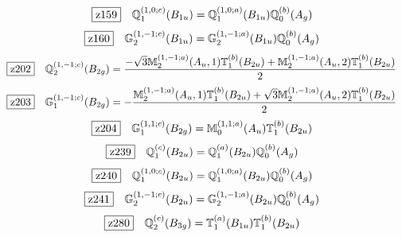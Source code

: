 \documentclass[fleqn,10pt,landscape]{jsarticle}
\begin{document}
\begin{dmath*}
\hspace*{3mm}\fbox{z159}\quad \mathbb{Q}_{1}^{(1,0;c)}(B_{1u})=\mathbb{Q}_{1}^{(1,0;a)}(B_{1u}) \mathbb{Q}_{0}^{(b)}(A_{g})
\end{dmath*}
\begin{dmath*}
\hspace*{3mm}\fbox{z160}\quad \mathbb{G}_{2}^{(1,-1;c)}(B_{1u})=\mathbb{G}_{2}^{(1,-1;a)}(B_{1u}) \mathbb{Q}_{0}^{(b)}(A_{g})
\end{dmath*}
\begin{dmath*}
\hspace*{3mm}\fbox{z202}\quad \mathbb{Q}_{2}^{(1,-1;c)}(B_{2g})=\frac{- \sqrt{3} \mathbb{M}_{2}^{(1,-1;a)}(A_{u},1) \mathbb{T}_{1}^{(b)}(B_{2u}) + \mathbb{M}_{2}^{(1,-1;a)}(A_{u},2) \mathbb{T}_{1}^{(b)}(B_{2u})}{2}
\end{dmath*}
\begin{dmath*}
\hspace*{3mm}\fbox{z203}\quad \mathbb{G}_{1}^{(1,-1;c)}(B_{2g})=- \frac{\mathbb{M}_{2}^{(1,-1;a)}(A_{u},1) \mathbb{T}_{1}^{(b)}(B_{2u}) + \sqrt{3} \mathbb{M}_{2}^{(1,-1;a)}(A_{u},2) \mathbb{T}_{1}^{(b)}(B_{2u})}{2}
\end{dmath*}
\begin{dmath*}
\hspace*{3mm}\fbox{z204}\quad \mathbb{G}_{1}^{(1,1;c)}(B_{2g})=\mathbb{M}_{0}^{(1,1;a)}(A_{u}) \mathbb{T}_{1}^{(b)}(B_{2u})
\end{dmath*}
\begin{dmath*}
\hspace*{3mm}\fbox{z239}\quad \mathbb{Q}_{1}^{(c)}(B_{2u})=\mathbb{Q}_{1}^{(a)}(B_{2u}) \mathbb{Q}_{0}^{(b)}(A_{g})
\end{dmath*}
\begin{dmath*}
\hspace*{3mm}\fbox{z240}\quad \mathbb{Q}_{1}^{(1,0;c)}(B_{2u})=\mathbb{Q}_{1}^{(1,0;a)}(B_{2u}) \mathbb{Q}_{0}^{(b)}(A_{g})
\end{dmath*}
\begin{dmath*}
\hspace*{3mm}\fbox{z241}\quad \mathbb{G}_{2}^{(1,-1;c)}(B_{2u})=\mathbb{G}_{2}^{(1,-1;a)}(B_{2u}) \mathbb{Q}_{0}^{(b)}(A_{g})
\end{dmath*}
\begin{dmath*}
\hspace*{3mm}\fbox{z280}\quad \mathbb{Q}_{2}^{(c)}(B_{3g})=\mathbb{T}_{1}^{(a)}(B_{1u}) \mathbb{T}_{1}^{(b)}(B_{2u})
\end{dmath*}
\end{document}
